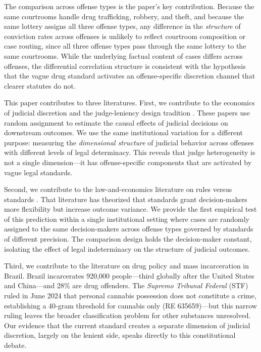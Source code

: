 \documentclass[12pt]{article}
\begin{document}
The comparison across offense types is the paper's key contribution. Because the same courtrooms handle drug trafficking, robbery, and theft, and because the same lottery assigns all three offense types, any difference in the \textit{structure} of conviction rates across offenses is unlikely to reflect courtroom composition or case routing, since all three offense types pass through the same lottery to the same courtrooms. While the underlying factual content of cases differs across offenses, the differential correlation structure is consistent with the hypothesis that the vague drug standard activates an offense-specific discretion channel that clearer statutes do not.

This paper contributes to three literatures. First, we contribute to the economics of judicial discretion and the judge-leniency design tradition \citep{kling2006, maestas2013, dobbie2018, bhuller2020, norris2021}. These papers use random assignment to estimate the causal effects of judicial decisions on downstream outcomes. We use the same institutional variation for a different purpose: measuring the \textit{dimensional structure} of judicial behavior across offenses with different levels of legal determinacy. This reveals that judge heterogeneity is not a single dimension---it has offense-specific components that are activated by vague legal standards.

Second, we contribute to the law-and-economics literature on rules versus standards \citep{ehrlich1974, kaplow1992, sunstein1995}. That literature has theorized that standards grant decision-makers more flexibility but increase outcome variance. We provide the first empirical test of this prediction within a single institutional setting where cases are randomly assigned to the same decision-makers across offense types governed by standards of different precision. The comparison design holds the decision-maker constant, isolating the effect of legal indeterminacy on the structure of judicial outcomes.

Third, we contribute to the literature on drug policy and mass incarceration in Brazil. Brazil incarcerates 920,000 people---third globally after the United States and China---and 28\% are drug offenders. The \textit{Supremo Tribunal Federal} (STF) ruled in June 2024 that personal cannabis possession does not constitute a crime, establishing a 40-gram threshold for cannabis only (RE 635659)---but this narrow ruling leaves the broader classification problem for other substances unresolved. Our evidence that the current standard creates a separate dimension of judicial discretion, largely on the lenient side, speaks directly to this constitutional debate.
\end{document}
